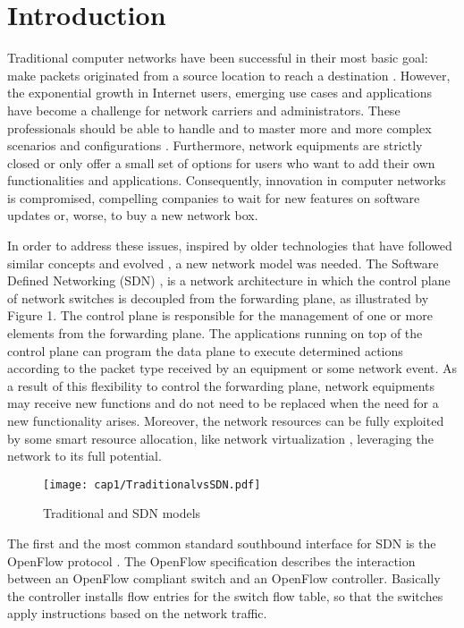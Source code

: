 \chapter{Introduction}
\label{cap:intro}

Traditional computer networks have been successful in their most basic goal: make packets originated from a source location to reach a destination \cite{Shenker95fundamentaldesign}. However, the exponential growth in Internet users, emerging use cases and applications have become a challenge for network carriers and administrators. These professionals should be able to handle and to master more and more complex scenarios and configurations \cite{Feldmann:2007:ICD:1273445.1273453}. Furthermore, network equipments are strictly closed or only offer a small set of options for users who want to add their own functionalities and applications. Consequently, innovation in computer networks is compromised, compelling companies to wait for new features on software updates or, worse, to buy a new network box. 

In order to address these issues, inspired by older technologies that have followed similar concepts and evolved \cite{Feamster:2014:RSI:2602204.2602219}, a new network model was needed. The Software Defined Networking (SDN) \cite{DBLP:journals/corr/KreutzRVRAU14}, is a network architecture in which the control plane of network switches is decoupled from the forwarding plane, as illustrated by Figure 1. The control plane is responsible for the management of one or more elements from the forwarding plane. The applications running on top of the control plane can program the data plane to execute determined actions according to the packet type received by an equipment or some network event.  As a result of this flexibility to control the forwarding plane, network equipments may receive new functions and do not need to be replaced when the need for a new functionality arises. Moreover, the network resources can be fully exploited by some smart resource allocation, like network virtualization \cite{FLOWVISOR} \cite{Al-Shabibi:2014:OMY:2620728.2620741}, leveraging the network to its full potential.

\begin{figure}[h!]
\centering
\texttt{[image: cap1/TraditionalvsSDN.pdf]}
\caption{Traditional and SDN models}
\label{fig:traditional_vs_sdn}
\end{figure}
    
The first and the most common standard southbound interface for SDN is the OpenFlow protocol \cite{McKeown:2008:OEI:1355734.1355746} \cite{2012onf_sdn}. The OpenFlow specification describes the interaction between an OpenFlow compliant switch and an OpenFlow controller. Basically the controller installs flow entries for the   switch flow table, so that the switches apply instructions based on the network traffic.


